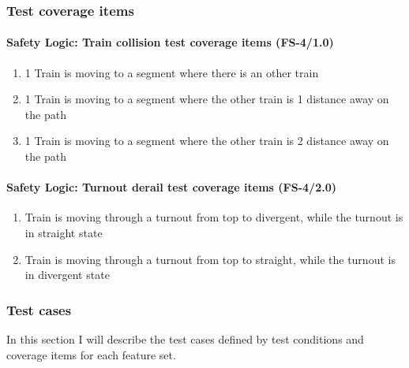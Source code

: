 \subsubsection{Test coverage items}
\paragraph{Safety Logic: Train collision test coverage items (FS-4/1.0)}
\begin{enumerate}[label=FS-5/1.0-\arabic*, leftmargin=*, format=\small]
	\item 1 Train is moving to a segment where there is an other train
	\item 1 Train is moving to a segment where the other train is 1 distance away on the path
	\item 1 Train is moving to a segment where the other train is 2 distance away on the path
\end{enumerate}
\paragraph{Safety Logic: Turnout derail test coverage items (FS-4/2.0)}
\begin{enumerate}[label=FS-5/2.0-\arabic*, leftmargin=*, format=\small]
	\item Train is moving through a turnout from top to divergent, while the turnout is in straight state
	\item Train is moving through a turnout from top to straight, while the turnout is in divergent state
\end{enumerate}

\subsubsection{Test cases}\label{section:UnitTestCases}
In this section I will describe the test cases defined by test conditions and coverage items for each feature set.
